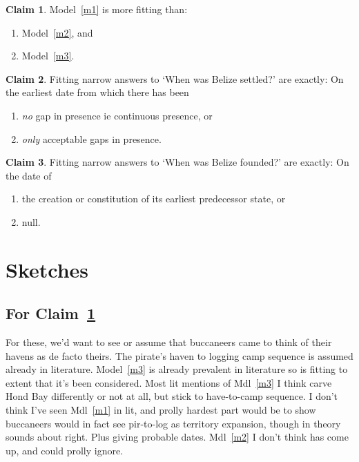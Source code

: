 \documentclass{amsart}
\theoremstyle{definition}%
\theoremstyle{definition}%
\newtheorem{claim}{Claim}
\theoremstyle{remark}%
\begin{document}
%
%
\begin{claim}
\label{c1}
Model~\ref{m1} is more fitting than: 
\begin{enumerate}
\item Model~\ref{m2}, and 
\item Model~\ref{m3}.
\end{enumerate}
\end{claim}
%
%
\begin{claim}
\label{c2}
Fitting narrow answers to `When was Belize settled?' are exactly: On the earliest date from which there has been%
\begin{enumerate}
\item \emph{no} gap in presence ie continuous presence, or%
\item \emph{only} acceptable gaps in presence.%
\end{enumerate}
\end{claim}
%
%
\begin{claim}
\label{c3}
Fitting narrow answers to `When was Belize founded?' are exactly: On the date of
\begin{enumerate}
\item the creation or constitution of its earliest predecessor state, or%
\item null.
\end{enumerate}
\end{claim}
%
%
%
%
\section{Sketches}
\label{s:sketches}
%
%
%
%
\subsection{For Claim~\ref{c1}}
For these, we'd want to see or assume that buccaneers came to think of their havens as de facto theirs. The pirate's haven to logging camp sequence is assumed already in literature. Model~\ref{m3} is already prevalent in literature so is fitting to extent that it's been considered. Most lit mentions of Mdl~\ref{m3} I think carve Hond Bay differently or not at all, but stick to have-to-camp sequence. I don't think I've seen Mdl~\ref{m1} in lit, and prolly hardest part would be to show buccaneers would in fact see pir-to-log as territory expansion, though in theory sounds about right. Plus giving probable dates. Mdl~\ref{m2} I don't think has come up, and could prolly ignore.
\end{document}
